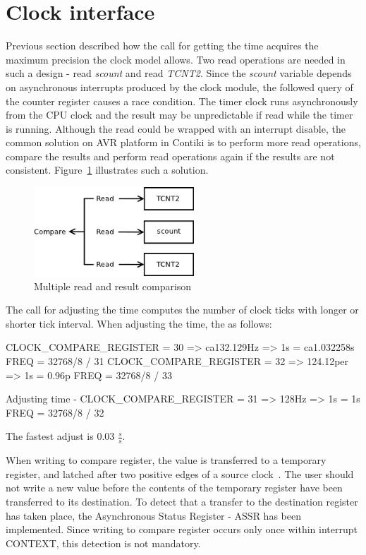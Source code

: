 
\section{Clock interface}
Previous section described how the call for getting the time acquires
the maximum precision the clock model allows.
Two read operations are needed in such a design - read {\it{scount}} and read {\it{TCNT2}}.
Since the {\it{scount}} variable depends on asynchronous interrupts produced by
the clock module, the followed query of the counter register causes a race condition.
The timer clock runs asynchronously from the CPU clock and
the result may be unpredictable if read while the timer is running.
Although the read could be wrapped with an interrupt disable,
the common solution on AVR platform in Contiki is to perform more read operations,
compare the results and perform read operations again if the results are not consistent.
Figure~\ref{fig:design-read} illustrates such a solution.

\begin{figure}
  \centering
  \includegraphics[width=6cm,keepaspectratio]{fig/read.png}
  \caption{Multiple read and result comparison}
  \label{fig:design-read}
\end{figure}

The call for adjusting the time computes the number of clock ticks
with longer or shorter tick interval.
When adjusting the time, the %
as follows:

CLOCK\_COMPARE\_REGISTER = 30 => ca132.129Hz => 1s = ca1.032258s
FREQ = 32768/8 / 31
CLOCK\_COMPARE\_REGISTER = 32 => 124.12per => 1s = 0.96p
FREQ = 32768/8 / 33

Adjusting time - CLOCK\_COMPARE\_REGISTER = 31 => 128Hz => 1s = 1s
FREQ = 32768/8 / 32

The fastest adjust is 0.03 $\frac{s}{s}$.

When writing to compare register, the value is transferred to a
temporary register, and latched after two positive edges of a source clock~\cite{avr-datasheet}.
The user should not write a new value before the contents
of the temporary register have been transferred to its destination.
To detect that a transfer to the destination register has taken place,
the Asynchronous Status Register - ASSR has been implemented.
Since writing to compare register occurs only once within interrupt CONTEXT, %
this detection is not mandatory.



